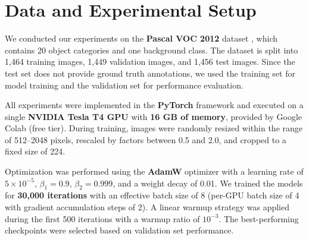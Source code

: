 \section{Data and Experimental Setup}
\label{subsec:data_and_experimental_setup}

We conducted our experiments on the \textbf{Pascal VOC 2012} dataset \cite{dataset_pascal_voc}, 
which contains 20 object categories and one background class. 
The dataset is split into 1,464 training images, 1,449 validation images, 
and 1,456 test images. Since the test set does not provide ground truth 
annotations, we used the training set for model training and the validation 
set for performance evaluation.

All experiments were implemented in the \textbf{PyTorch} framework and executed 
on a single \textbf{NVIDIA Tesla T4 GPU} with \textbf{16 GB of memory}, 
provided by Google Colab (free tier). During training, images were randomly 
resized within the range of 512--2048 pixels, rescaled by factors between 
0.5 and 2.0, and cropped to a fixed size of 224.

Optimization was performed using the \textbf{AdamW} optimizer with a learning 
rate of $5 \times 10^{-5}$, $\beta_1 = 0.9$, $\beta_2 = 0.999$, and a weight 
decay of 0.01. We trained the models for \textbf{30,000 iterations} with an 
effective batch size of 8 (per-GPU batch size of 4 with gradient accumulation 
steps of 2). A linear warmup strategy was applied during the first 500 iterations 
with a warmup ratio of $10^{-3}$. The best-performing checkpoints were selected 
based on validation set performance.

